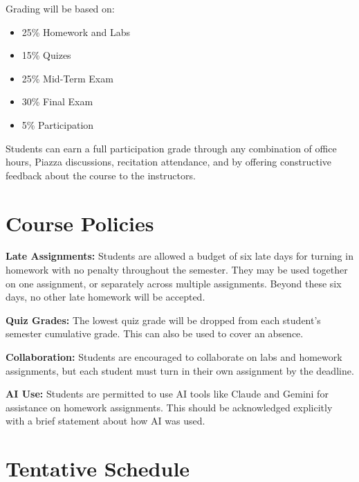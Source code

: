 \documentclass[11pt,letterpaper]{article}
\begin{document}
Grading will be based on:
\begin{itemize}
	\item 25\% Homework and Labs
	\item 15\% Quizes
	\item 25\% Mid-Term Exam
	\item 30\% Final Exam
	\item 5\% Participation
\end{itemize}
Students can earn a full participation grade through any combination of office hours, Piazza discussions, recitation attendance, and by offering constructive feedback about the course to the instructors.


\section*{Course Policies}

\textbf{Late Assignments:} Students are allowed a budget of six late days for turning in homework with no penalty throughout the semester. They may be used together on one assignment, or separately across multiple assignments. Beyond these six days, no other late homework will be accepted.

\noindent\textbf{Quiz Grades:} The lowest quiz grade will be dropped from each student's semester cumulative grade. This can also be used to cover an absence.

\noindent \textbf{Collaboration:} Students are encouraged to collaborate on labs and homework assignments, but each student must turn in their own assignment by the deadline.

\noindent \textbf{AI Use:} Students are permitted to use AI tools like Claude and Gemini for assistance on homework assignments. This should be acknowledged explicitly with a brief statement about how AI was used.

\section*{Tentative Schedule}
\end{document}

